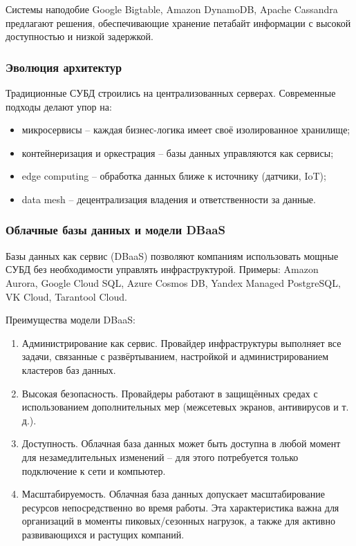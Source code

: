 Системы наподобие Google Bigtable, Amazon DynamoDB, Apache Cassandra предлагают решения, обеспечивающие хранение петабайт информации с высокой доступностью и низкой задержкой.

\subsubsection{Эволюция архитектур}

Традиционные СУБД строились на централизованных серверах. Современные подходы делают упор на:
\begin{itemize}
	\item микросервисы -- каждая бизнес-логика имеет своё изолированное хранилище;
	\item контейнеризация и оркестрация -- базы данных управляются как сервисы;
	\item edge computing -- обработка данных ближе к источнику (датчики, IoT);
	\item data mesh -- децентрализация владения и ответственности за данные.
\end{itemize}

\subsubsection{Облачные базы данных и модели DBaaS}

Базы данных как сервис (DBaaS) позволяют компаниям использовать мощные СУБД без необходимости управлять инфраструктурой. Примеры: Amazon Aurora, Google Cloud SQL, Azure Cosmos DB, Yandex Managed PostgreSQL, VK Cloud, Tarantool Cloud.

Преимущества модели DBaaS:
\begin{enumerate}
	\item Администрирование как сервис. Провайдер инфраструктуры выполняет все задачи, связанные с развёртыванием, настройкой и администрированием кластеров баз данных. 
	\item Высокая безопасность. Провайдеры работают в защищённых средах с использованием дополнительных мер (межсетевых экранов, антивирусов и т. д.).
	\item Доступность. Облачная база данных может быть доступна в любой момент для незамедлительных изменений -- для этого потребуется только подключение к сети и компьютер.
	\item Масштабируемость. Облачная база данных допускает масштабирование ресурсов непосредственно во время работы. Эта характеристика важна для организаций в моменты пиковых/сезонных нагрузок, а также для активно развивающихся и растущих компаний. 
\end{enumerate}

